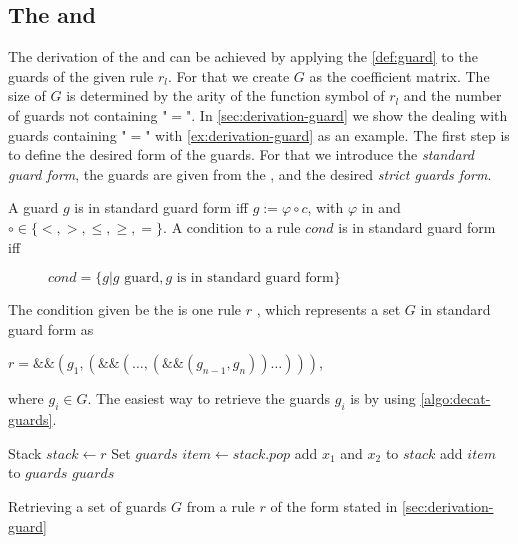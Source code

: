 \subsection{The \guardmatrix and \guardconstants}
\label{sec:derivation-guard}
The derivation of the \guardmatrix and \guardconstants can be achieved by applying the \autoref{def:guard} to the guards of the given rule $r_l$. For that we create $G$ as the coefficient matrix. The size of $G$ is determined by the arity of the function symbol of $r_l$ and the number of guards not containing "$=$". In \autoref{sec:derivation-guard} we show the dealing with guards containing "$=$" with \autoref{ex:derivation-guard} as an example. The first step is to define the desired form of the guards. For that we introduce the \textit{standard guard form}, the guards are given from the \seg, and the desired \textit{strict guards form}.
\begin{definition}
	A guard $g$ is in standard guard form iff\newline
	$g := \varphi \circ c$, with
	$\varphi$ in \stdLinInt and $\circ \in \{ <, >, \le, \ge, = \}$.\newline
	A condition to a rule $cond$ is in standard guard form iff 
	\begin{figure}[H]
		\centering
		$cond = \{ g | g\text{ guard}, g\text{ is in standard guard form}\}$
	\end{figure}
\end{definition} 
The condition given be the \seg is one rule $r$ , which represents a set $G$  in standard guard form as 
\begin{center}
	$r = \&\&(g_1,( \&\& (\dots,(\&\&(g_{n-1},g_n) )\dots)))$,
\end{center}
where $g_i \in G$.\newline
The easiest way to retrieve the guards $g_i$ is by using \autoref{algo:decat-guards}.

\begin{algorithm}
	\begin{algorithmic}[1]
		 
			\State Stack $stack \gets r$
			\State Set $guards$
				\State $item \gets stack.pop$
					
					\State add $x_1$ and $x_2$ to $stack$
				\Else
					\State add $item$ to $guards$	
				\EndIf				
			\EndWhile	
			\State \Return $guards$
		\EndFunction		
	\end{algorithmic}
	\caption{Retrieving a set of guards $G$ from a rule $r$ of the form stated in \autoref{sec:derivation-guard}}
	\label{algo:decat-guards}
\end{algorithm}

